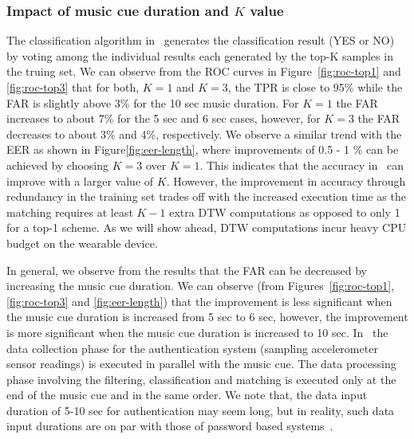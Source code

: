 \subsubsection{Impact of music cue duration and $K$ value}

The classification algorithm in \systemname~generates the classification result (YES or NO) by voting among the individual results each generated by the top-K samples in the truing set. We can observe from the ROC curves in Figure~\ref{fig:roc-top1} and \ref{fig:roc-top3} that
for both, $K=1$ and $K=3$, the TPR is close to 95\% while the FAR is slightly
above 3\% for the 10 sec music duration. For $K = 1$ the FAR increases to
about 7\% for the 5 sec and 6 sec cases, however, for $K = 3$ the FAR
decreases to about 3\% and 4\%, respectively.
We observe a similar trend with the EER as shown in
Figure\ref{fig:eer-length}, where improvements of 0.5 - 1 \%
can be achieved by choosing $K = 3$ over $K = 1$.
This indicates that the accuracy in \systemname~can improve with a larger
value of $K$. However, the improvement in accuracy through redundancy in the
training set trades off with the increased execution time as the
matching requires at least $K - 1$  extra DTW computations as opposed to only
1 for a top-1 scheme. As we will show ahead, DTW computations incur heavy CPU
budget on the wearable device.

In general, we observe from the results that the FAR can
be decreased by increasing the music cue duration.
We can observe (from Figures~\ref{fig:roc-top1}, \ref{fig:roc-top3} and
\ref{fig:eer-length}) that the improvement is less significant when the music
cue duration is increased from 5 sec to 6 sec, however, the improvement is
more
significant when the music cue duration is increased to 10 sec.
In \systemname~the data collection phase for the authentication system
(sampling accelerometer sensor readings) is executed in parallel with the
music cue. The data processing phase involving the filtering, classification
and matching is executed only at the end of the music cue and in the same
order.
We note that, the data input duration of 5-10 sec for authentication
may seem long, but in reality, such data input durations are on par with those
of password based systems~\cite{von2013patterns}.


